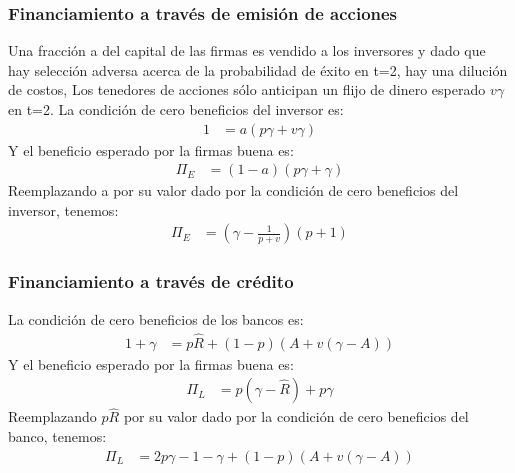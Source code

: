 \documentclass[10pt, xcolor=table, x11names]{beamer}
\begin{document}
\begin{frame}
    \frametitle{{\normalsize Financiamiento a través de emisión de acciones} {}}
    Una fracción a del capital de las firmas es vendido a los inversores y dado que hay selección adversa acerca de la probabilidad de éxito en t=2, hay una dilución de costos, Los tenedores de acciones sólo anticipan un flijo de dinero esperado $v\gamma$ en t=2.
    La condición de cero beneficios del inversor es:
   \begin{align}
   1&=a(p\gamma+v\gamma)
   \end{align}
   Y el beneficio esperado por la firmas buena es:
   \begin{align}
   \Pi_{E}&=(1-a)(p\gamma+\gamma)
    \end{align}
   Reemplazando a por su valor dado por la condición de cero beneficios del inversor, tenemos:
   \begin{align}
   \Pi_{E}&=(\gamma-\frac{1}{p+v})(p+1)
   \end{align}
\end{frame}


\begin{frame}
    \frametitle{{\normalsize Financiamiento a través de crédito} {}}
    La condición de cero beneficios de los bancos es:
    \begin{align}
    1+\gamma&=p\hat{R} +(1-p)(A+v(\gamma-A))
    \end{align}
    Y el beneficio esperado por la firmas buena es:
    \begin{align}
    \Pi_{L}&=p(\gamma-\hat{R})+p\gamma
    \end{align}
    Reemplazando $p\hat{R}$ por su valor dado por la condición de cero beneficios del banco, tenemos:
    \begin{align}
    \Pi_{L}&=2p\gamma-1-\gamma+(1-p)(A+v(\gamma-A))
    \end{align}
    
\end{frame}
\end{document}
